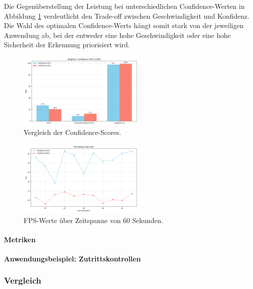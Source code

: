 Die Gegenüberstellung der Leistung bei unterschiedlichen Confidence-Werten in Abbildung \ref{fig:vergleich_confidence} verdeutlicht den Trade-off zwischen Geschwindigkeit und Konfidenz. Die Wahl des optimalen Confidence-Werts hängt somit stark von der jeweiligen Anwendung ab, bei der entweder eine hohe Geschwindigkeit oder eine hohe Sicherheit der Erkennung priorisiert wird.

\begin{figure}[ht]
    \centering
    \includegraphics[width=0.55\textwidth]{data/Vergleich_Confidence_50_vs_80.png}
    \caption{Vergleich der Confidence-Scores.}
    \label{fig:vergleich_confidence}
\end{figure}


\begin{figure}[ht]
    \centering
    \includegraphics[width=0.55\textwidth]{data/FPS_ueber_Zeit.png}
    \caption{FPS-Werte über Zeitspanne von 60 Sekunden.}
    \label{fig:fps_ueber_zeit}
\end{figure}


\paragraph{Metriken}
\paragraph{Anwendungsbeispiel: Zutrittskontrollen}

\subsubsection{Vergleich}
